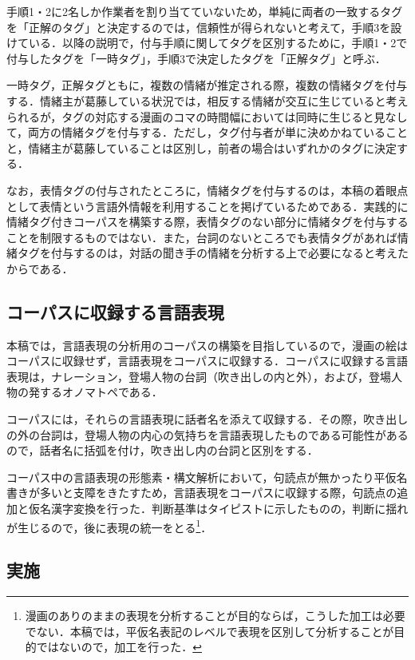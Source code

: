 \documentclass[japanese]{jnlp_1.3c}
\begin{document}
手順1・2に2名しか作業者を割り当てていないため，単純に両者の一致するタグを「正解のタグ」と決定するのでは，信頼性が得られないと考えて，手順3を設けている．以降の説明で，付与手順に関してタグを区別するために，手順1・2で付与したタグを「一時タグ」，手順3で決定したタグを「正解タグ」と呼ぶ．

一時タグ，正解タグともに，複数の情緒が推定される際，複数の情緒タグを付与する．情緒主が葛藤している状況では，相反する情緒が交互に生じていると考えられるが，タグの対応する漫画のコマの時間幅においては同時に生じると見なして，両方の情緒タグを付与する．ただし，タグ付与者が単に決めかねていることと，情緒主が葛藤していることは区別し，前者の場合はいずれかのタグに決定する．

なお，表情タグの付与されたところに，情緒タグを付与するのは，本稿の着眼点として表情という言語外情報を利用することを掲げているためである．実践的に情緒タグ付きコーパスを構築する際，表情タグのない部分に情緒タグを付与することを制限するものではない．また，台詞のないところでも表情タグがあれば情緒タグを付与するのは，対話の聞き手の情緒を分析する上で必要になると考えたからである．

\subsection{コーパスに収録する言語表現}

本稿では，言語表現の分析用のコーパスの構築を目指しているので，漫画の絵はコーパスに収録せず，言語表現をコーパスに収録する．コーパスに収録する言語表現は，ナレーション，登場人物の台詞（吹き出しの内と外），および，登場人物の発するオノマトペである．

コーパスには，それらの言語表現に話者名を添えて収録する．その際，吹き出しの外の台詞は，登場人物の内心の気持ちを言語表現したものである可能性があるので，話者名に括弧を付け，吹き出し内の台詞と区別をする．

コーパス中の言語表現の形態素・構文解析において，句読点が無かったり平仮名書きが多いと支障をきたすため，言語表現をコーパスに収録する際，句読点の追加と仮名漢字変換を行った．判断基準はタイピストに示したものの，判断に揺れが生じるので，後に表現の統一をとる\footnote{漫画のありのままの表現を分析することが目的ならば，こうした加工は必要でない．本稿では，平仮名表記のレベルで表現を区別して分析することが目的ではないので，加工を行った．}．


\subsection{実施}
\end{document}
